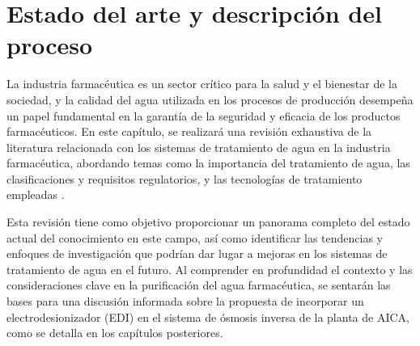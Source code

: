\chapter{Estado del arte y descripción del proceso}
\vspace{-2cm} 
La industria farmacéutica es un sector crítico para la salud y el bienestar de la sociedad, y la calidad del agua utilizada
en los procesos de producción desempeña un papel fundamental en la garantía de la seguridad y eficacia de los productos farmacéuticos. En este capítulo,
se realizará una revisión exhaustiva de la literatura relacionada con los sistemas de tratamiento de agua en la industria farmacéutica, abordando temas
como la importancia del tratamiento de agua, las clasificaciones y requisitos regulatorios, y las tecnologías de tratamiento empleadas \cite{juanantoniodelacuerdaImportanciaAguaIndustria2021}.
 
Esta revisión tiene como objetivo proporcionar un panorama completo del estado actual del conocimiento en este campo, así como identificar las tendencias y enfoques de investigación que podrían dar lugar a mejoras en los sistemas de tratamiento de agua en el futuro. Al comprender en profundidad el contexto y las consideraciones clave en la purificación del agua farmacéutica, se sentarán las bases para una discusión informada sobre la propuesta de incorporar un electrodesionizador (EDI) en el sistema de ósmosis inversa de la planta de AICA, como se detalla en los capítulos posteriores.


